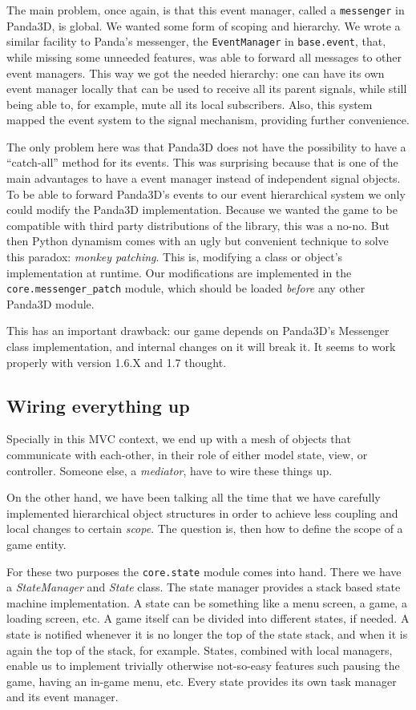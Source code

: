 \documentclass[a4paper,10pt]{article}
\begin{document}
The main problem, once again, is that this event manager, called a
\texttt{messenger} in Panda3D, is global. We wanted some
form of scoping and hierarchy. We wrote a similar facility to Panda's
messenger, the \texttt{EventManager} in \texttt{base.event}, that,
while missing some unneeded features, was able to forward
all messages to other event managers. This way we got the needed
hierarchy: one can have its own event manager locally that can be used to receive all its parent signals, while still being
able to, for example, mute all its local subscribers. Also, this
system mapped the event system to the signal mechanism, providing
further convenience.

The only problem here was that Panda3D does not have the possibility
to have a ``catch-all'' method for its events. This was surprising
because that is one of the main advantages to have a event manager
instead of independent signal objects. To be able to forward Panda3D's
events to our event hierarchical system we only could modify the
Panda3D implementation. Because we wanted the game to be compatible
with third party distributions of the library, this was a no-no. But
then Python dynamism comes with an ugly but convenient technique to
solve this  paradox: \emph{monkey patching}. This is, modifying a class or
object's implementation at runtime. Our modifications are implemented in the
\texttt{core.messenger\_patch} module, which should be loaded
\emph{before} any other Panda3D module.

This has an important drawback: our game depends on Panda3D's
Messenger class implementation, and internal changes on it will break
it. It seems to work properly with version 1.6.X and 1.7 thought.

\subsection{Wiring everything up}

Specially in this MVC context, we end up with a mesh of objects that
communicate with each-other, in their role of either model state,
view, or controller. Someone else, a \emph{mediator}\cite{gamma95design}, have
to wire these things up.

On the other hand, we have been talking all the time that we have
carefully implemented hierarchical object structures in order to
achieve less coupling and local changes to certain \emph{scope}. The
question is, then how to define the scope of a game entity.

For these two purposes the \texttt{core.state} module comes into
hand. There we have a \emph{StateManager} and \emph{State} class. The
state manager provides a stack based state machine implementation. A
state can be something like a menu screen, a game, a loading screen,
etc. A game itself can be divided into different states, if needed. A
state is notified whenever it is no longer the top of the state stack,
and when it is again the top of the stack, for example. States,
combined with local managers, enable us to implement trivially 
otherwise not-so-easy features such pausing the game, having an
in-game menu, etc. Every state provides its own task manager and its
event manager.
\end{document}
